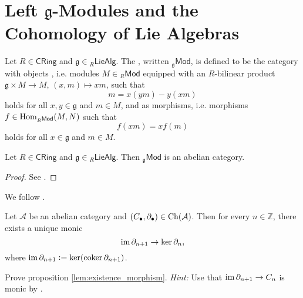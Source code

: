 \section*{Left $\mathfrak{g}$-Modules and the Cohomology of Lie Algebras}

\begin{definition}
	Let $R \in \mathsf{CRing}$ and $\mathfrak{g} \in {_{R}\mathsf{LieAlg}}$. The , written $_{\mathfrak{g}}\mathsf{Mod}$, is defined to be the category with objects , i.e. modules $M \in {_{R}}\mathsf{Mod}$ equipped with an $R$-bilinear product $\mathfrak{g} \times M \to M$, $(x,m) \mapsto xm$, such that 
	\begin{equation*}
		[x,y]m = x(ym) - y(xm)
	\end{equation*}
	\noindent holds for all $x,y \in \mathfrak{g}$ and $m \in M$, and  as morphisms, i.e. morphisms $f \in \operatorname{Hom}_{_{R}\mathsf{Mod}}(M,N)$ such that 
	\begin{equation*}
		f(xm) = xf(m)
	\end{equation*}
	\noindent holds for all $x \in \mathfrak{g}$ and $m \in M$.
\end{definition}

\begin{proposition}
	Let $R \in \mathsf{CRing}$ and $\mathfrak{g} \in {_{R}\mathsf{LieAlg}}$. Then $_{\mathfrak{g}}\mathsf{Mod}$ is an abelian category.
\end{proposition}

\begin{proof}
	See \cite[220]{weibel:homological_algebra:1994}.
\end{proof}

We follow \cite[178]{kashiwara:categories:2006}.

\begin{proposition}
	\label{lem:existence_morphism}
	Let $\mathcal{A}$ be an abelian category and $(C_\bullet,\partial_\bullet) \in \operatorname{Ch}(\mathcal{A})$. Then for every $n \in \mathbb{Z}$, there exists a unique monic 
	\begin{equation*}
		\operatorname{im} \partial_{n + 1} \to \ker \partial_n,
	\end{equation*}
	\noindent where $\operatorname{im} \partial_{n + 1} := \ker(\operatorname{coker} \partial_{n + 1})$.
\end{proposition}

\begin{exercise}
	Prove proposition \ref{lem:existence_morphism}. \emph{Hint:} Use that $\operatorname{im} \partial_{n + 1} \to C_n$ is monic by \cite[199]{maclane:categories:1978}.
\end{exercise}

